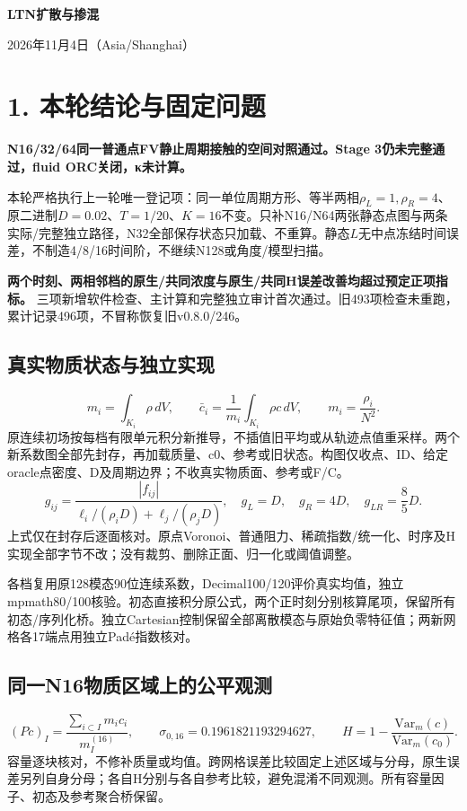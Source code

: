 \documentclass[11pt,a4paper]{article}
\begin{document}
\begin{center}{\LARGE\bfseries LTN扩散与掺混}\par\vspace{3mm}{\Large 周期接触oracle三档物质空间对照}\par\vspace{3mm}2026年11月4日（Asia/Shanghai）\end{center}
\section*{1. 本轮结论与固定问题}
\textbf{N16/32/64同一普通点FV静止周期接触的空间对照通过。Stage 3仍未完整通过，fluid ORC关闭，κ未计算。}

本轮严格执行上一轮唯一登记项：同一单位周期方形、等半两相$\rho_L=1,\rho_R=4$、原二进制$D=0.02$、$T=1/20$、$K=16$不变。只补N16/N64两张静态点图与两条实际/完整独立路径，N32全部保存状态只加载、不重算。静态$L$无中点冻结时间误差，不制造4/8/16时间阶，不继续N128或角度/模型扫描。

\textbf{两个时刻、两相邻档的原生/共同浓度与原生/共同H误差改善均超过预定正项指标。} 三项新增软件检查、主计算和完整独立审计首次通过。旧493项检查未重跑，累计记录496项，不冒称恢复旧v0.8.0/246。

\subsection*{真实物质状态与独立实现}
\[
m_i=\int_{K_i}\rho\,dV,\qquad
\bar c_i=\frac1{m_i}\int_{K_i}\rho c\,dV,\qquad m_i=\frac{\rho_i}{N^2}.
\]
原连续初场按每档有限单元积分新推导，不插值旧平均或从轨迹点值重采样。两个新系数图全部先封存，再加载质量、c0、参考或旧状态。构图仅收点、ID、给定oracle点密度、D及周期边界；不收真实物质面、参考或F/C。
\[
g_{ij}=\frac{|f_{ij}|}{\ell_i/(\rho_iD)+\ell_j/(\rho_jD)},\quad
g_L=D,\quad g_R=4D,\quad g_{LR}=\frac85D.
\]
上式仅在封存后逐面核对。原点Voronoi、普通阻力、稀疏指数/统一化、时序及H实现全部字节不改；没有裁剪、删除正面、归一化或阈值调整。

各档复用原128模态90位连续系数，Decimal100/120评价真实均值，独立mpmath80/100核验。初态直接积分原公式，两个正时刻分别核算尾项，保留所有初态/序列化桥。独立Cartesian控制保留全部离散模态与原始负零特征值；两新网格各17端点用独立Padé指数核对。

\subsection*{同一N16物质区域上的公平观测}
\[
(Pc)_I=\frac{\sum_{i\subset I}m_i c_i}{m_I^{(16)}},\qquad
\sigma_{0,16}=0.1961821193294627,\qquad H=1-\frac{\mathrm{Var}_m(c)}{\mathrm{Var}_m(c_0)}.
\]
容量逐块核对，不修补质量或均值。跨网格误差比较固定上述区域与分母，原生误差另列自身分母；各自H分别与各自参考比较，避免混淆不同观测。所有容量因子、初态及参考聚合桥保留。
\newpage
\end{document}
